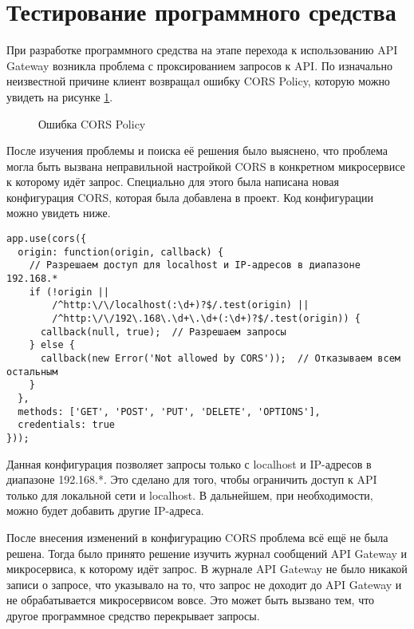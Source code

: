 \section{Тестирование программного средства}
\label{sec:principal}

При разработке программного средства на этапе перехода к использованию API Gateway возникла проблема с проксированием запросов
к API. По изначально неизвестной причине клиент возвращал ошибку CORS Policy, которую можно увидеть на рисунке \ref{fig:err}.

\begin{figure}[ht]
    \centering
    \caption{Ошибка CORS Policy}
    \label{fig:err}
\end{figure}

После изучения проблемы и поиска её решения было выяснено, что проблема могла быть вызвана неправильной настройкой CORS в конкретном
микросервисе к которому идёт запрос. Специально для этого была написана новая конфигурация CORS, которая была добавлена в проект.
Код конфигурации можно увидеть ниже.

\begin{lstlisting}[style=CodeListing]
app.use(cors({
  origin: function(origin, callback) {
    // Разрешаем доступ для localhost и IP-адресов в диапазоне 192.168.*
    if (!origin || 
        /^http:\/\/localhost(:\d+)?$/.test(origin) || 
        /^http:\/\/192\.168\.\d+\.\d+(:\d+)?$/.test(origin)) {
      callback(null, true);  // Разрешаем запросы
    } else {
      callback(new Error('Not allowed by CORS'));  // Отказываем всем остальным
    }
  },
  methods: ['GET', 'POST', 'PUT', 'DELETE', 'OPTIONS'],
  credentials: true
}));
\end{lstlisting}

Данная конфигурация позволяет запросы только с localhost и IP-адресов в диапазоне 192.168.*. Это сделано для того, чтобы
ограничить доступ к API только для локальной сети и localhost. В дальнейшем, при необходимости, можно будет добавить другие IP-адреса.

После внесения изменений в конфигурацию CORS проблема всё ещё не была решена. Тогда было принято решение изучить журнал сообщений 
API Gateway и микросервиса, к которому идёт запрос. В журнале API Gateway не было никакой записи о запросе, что указывало на то, что
запрос не доходит до API Gateway и не обрабатывается микросервисом вовсе. Это может быть вызвано тем, что другое программное средство
перекрывает запросы.

